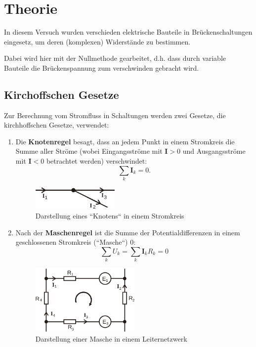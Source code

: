 \section{Theorie}
\label{sec:Theorie}

In diesem Versuch wurden verschieden elektrische Bauteile in Brückenschaltungen
eingesetz, um deren (komplexen) Widerstände zu bestimmen.

Dabei wird hier mit der Nullmethode gearbeitet, d.h. dass durch variable Bauteile
die Brückenspannung zum verschwinden gebracht wird.

\subsection{Kirchoffschen Gesetze}
\label{sec:kirchhoff}
Zur Berechnung vom Stromfluss in Schaltungen werden zwei Gesetze, die
kirchhoffschen Gesetze, verwendet:
\begin{enumerate}
	\item Die \textbf{Knotenregel} besagt, dass an jedem Punkt in einem Stromkreis
		die Summe aller Ströme (wobei Eingangsströme mit $\mathbf{I} > 0$ und
		Ausgangsströme mit $\mathbf{I} < 0$ betrachtet werden) verschwindet:
		\begin{equation}
			\sum_k \mathbf{I}_k = 0.
			\label{eqn:knotenregel}
		\end{equation}
		\begin{figure}[H]
			\centering
			\includegraphics[width=0.4\textwidth]{bilder/knotenregel.png}
			\caption{Darstellung eines ``Knotens`` in einem Stromkreis}
			\label{fig:knotenregel}
		\end{figure}
	\item Nach der \textbf{Maschenregel} ist die Summe der Potentialdifferenzen
		in einem geschlossenen Stromkreis (``Masche``) 0:
		\begin{equation}
			\sum_k U_k = \sum_k \mathbf{I}_k R_k= 0
			\label{eqn:maschenregel}
		\end{equation}
		\begin{figure}[H]
			\centering
			\includegraphics[width=0.5\textwidth]{bilder/maschenregel.png}
			\caption{Darstellung einer Masche in einem Leiternetzwerk}
			\label{fig:maschenregel}
		\end{figure}
\end{enumerate}

